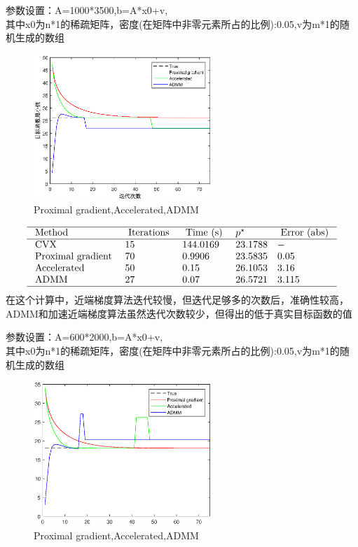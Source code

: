 \documentclass[10pt,aspectratio=43,mathserif,dvipsnames,svgnames,x11names]{beamer}
\begin{document}
	\begin{frame}
		参数设置：A=1000*3500,b=A*x0+v,\\ 其中x0为n*1的稀疏矩阵，密度(在矩阵中非零元素所占的比例):0.05,v为m*1的随机生成的数组\\
		\begin{figure}[H]
			\centering
			\includegraphics[width=0.6\textwidth]{2.eps}
			\caption{Proximal gradient,Accelerated,ADMM}
		\end{figure}
	\end{frame}
	\begin{frame}
		$$\begin{array}{llllll}
		\hline \text { Method } & \text { Iterations } & \text { Time (s) } & p^{\star} & \text { Error (abs) } \\
		\hline \text { CVX } & 15 & 144.0169 & 23.1788 & -  \\
		\text { Proximal gradient } & 70 & 0.9906 & 23.5835 & 0.05  \\
		\text { Accelerated } & 50 & 0.15 &  26.1053 & 3.16 \\
		\text { ADMM } & 27 & 0.07 & 26.5721 & 3.115  \\
		\hline
		\end{array}$$
			在这个计算中，近端梯度算法迭代较慢，但迭代足够多的次数后，准确性较高，ADMM和加速近端梯度算法虽然迭代次数较少，但得出的低于真实目标函数的值
	\end{frame}
	\begin{frame}
		参数设置：A=600*2000,b=A*x0+v,\\ 其中x0为n*1的稀疏矩阵，密度(在矩阵中非零元素所占的比例):0.05,v为m*1的随机生成的数组
		\begin{figure}[H]
			\centering
			\includegraphics[width=0.6\textwidth]{3.eps}
			\caption{Proximal gradient,Accelerated,ADMM}
		\end{figure}
	\end{frame}
\end{document}

